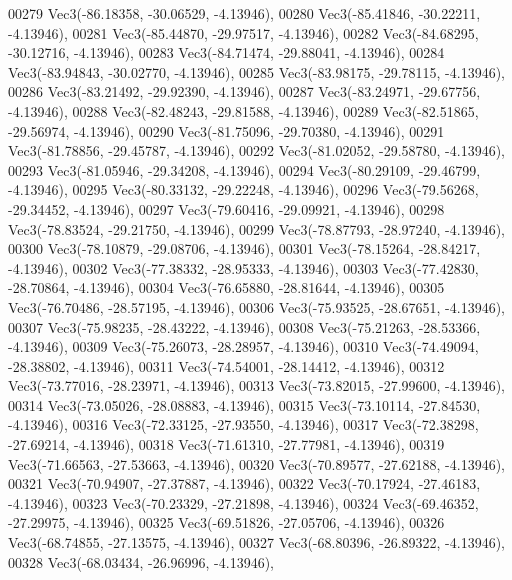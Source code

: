 \begin{DoxyCode}
00279         Vec3(-86.18358, -30.06529, -4.13946),
00280         Vec3(-85.41846, -30.22211, -4.13946),
00281         Vec3(-85.44870, -29.97517, -4.13946),
00282         Vec3(-84.68295, -30.12716, -4.13946),
00283         Vec3(-84.71474, -29.88041, -4.13946),
00284         Vec3(-83.94843, -30.02770, -4.13946),
00285         Vec3(-83.98175, -29.78115, -4.13946),
00286         Vec3(-83.21492, -29.92390, -4.13946),
00287         Vec3(-83.24971, -29.67756, -4.13946),
00288         Vec3(-82.48243, -29.81588, -4.13946),
00289         Vec3(-82.51865, -29.56974, -4.13946),
00290         Vec3(-81.75096, -29.70380, -4.13946),
00291         Vec3(-81.78856, -29.45787, -4.13946),
00292         Vec3(-81.02052, -29.58780, -4.13946),
00293         Vec3(-81.05946, -29.34208, -4.13946),
00294         Vec3(-80.29109, -29.46799, -4.13946),
00295         Vec3(-80.33132, -29.22248, -4.13946),
00296         Vec3(-79.56268, -29.34452, -4.13946),
00297         Vec3(-79.60416, -29.09921, -4.13946),
00298         Vec3(-78.83524, -29.21750, -4.13946),
00299         Vec3(-78.87793, -28.97240, -4.13946),
00300         Vec3(-78.10879, -29.08706, -4.13946),
00301         Vec3(-78.15264, -28.84217, -4.13946),
00302         Vec3(-77.38332, -28.95333, -4.13946),
00303         Vec3(-77.42830, -28.70864, -4.13946),
00304         Vec3(-76.65880, -28.81644, -4.13946),
00305         Vec3(-76.70486, -28.57195, -4.13946),
00306         Vec3(-75.93525, -28.67651, -4.13946),
00307         Vec3(-75.98235, -28.43222, -4.13946),
00308         Vec3(-75.21263, -28.53366, -4.13946),
00309         Vec3(-75.26073, -28.28957, -4.13946),
00310         Vec3(-74.49094, -28.38802, -4.13946),
00311         Vec3(-74.54001, -28.14412, -4.13946),
00312         Vec3(-73.77016, -28.23971, -4.13946),
00313         Vec3(-73.82015, -27.99600, -4.13946),
00314         Vec3(-73.05026, -28.08883, -4.13946),
00315         Vec3(-73.10114, -27.84530, -4.13946),
00316         Vec3(-72.33125, -27.93550, -4.13946),
00317         Vec3(-72.38298, -27.69214, -4.13946),
00318         Vec3(-71.61310, -27.77981, -4.13946),
00319         Vec3(-71.66563, -27.53663, -4.13946),
00320         Vec3(-70.89577, -27.62188, -4.13946),
00321         Vec3(-70.94907, -27.37887, -4.13946),
00322         Vec3(-70.17924, -27.46183, -4.13946),
00323         Vec3(-70.23329, -27.21898, -4.13946),
00324         Vec3(-69.46352, -27.29975, -4.13946),
00325         Vec3(-69.51826, -27.05706, -4.13946),
00326         Vec3(-68.74855, -27.13575, -4.13946),
00327         Vec3(-68.80396, -26.89322, -4.13946),
00328         Vec3(-68.03434, -26.96996, -4.13946),

\end{DoxyCode}
